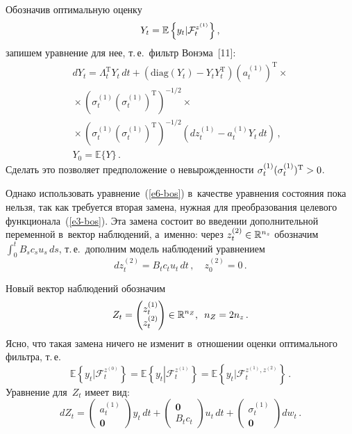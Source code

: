 \begin{multicols}{2}
     Обозначив оптимальную оценку 
     $$
     Y_t\hm= \mathbb{E} \left\{y_t \vert 
\mathcal{F}_t^{z^{(1)}}\right\},
$$
 запишем уравнение для нее, т.\,е.\ фильтр 
Во\-нэ\-ма~[11]:
         \begin{multline}
     dY_t= \Lambda_t^{\mathrm{T}} Y_t\,dt +\left( \mathrm{diag} \left(Y_t\right)-Y_t Y_t^{\mathrm{T}}\right) 
\left( a_t^{(1)}\right)^{\mathrm{T}} \times{}\\
{}\times \left( \sigma_t^{(1)} \left( 
\sigma_t^{(1)}\right)^{\mathrm{T}}\right)^{-1/2} \times\\
     {}\times 
     \left( \sigma_t^{(1)} \left( \sigma_t^{(1)}\right)^{\mathrm{T}}\right)^{-1/2} \left( 
dz_t^{(1)} -a_t^{(1)} Y_t \,dt\right) \,, \\ 
Y_0=\mathbb{E}\{Y\}\,.
     \label{e6-bos}
     \end{multline}
      Сделать это позволяет предположение о не\-вы\-рож\-ден\-ности  $\sigma_t^{(1)}(\sigma_t^{(1)})^{\mathrm{T}}\hm>0$. 
     
     Однако использовать уравнение~(\ref{e6-bos}) в~качестве уравнения состояния 
пока нельзя, так как требуется вторая замена, нужная для преобразования 
целевого функционала~(\ref{e3-bos}). Эта замена состоит во введении 
дополнительной переменной в~вектор наблюдений, а~именно: через 
$z_t^{(2)} \hm\in \mathbb{R}^{n_z}$ обозначим $\int\nolimits_0^t B_s c_s u_s 
\,ds$, т.\,е.\ дополним модель наблюдений уравнением
     $$
     dz_t^{(2)}=B_t c_t u_t \,dt\,,\quad z_0^{(2)}=0\,.
     $$
     
     Новый вектор наблюдений обозначим 
     $$
     Z_t= \begin{pmatrix} 
z_t^{(1)}\\ z_t^{(2)}\end{pmatrix} \in \mathbb{R}^{n_Z},\enskip n_Z=2n_z\,.
$$ 
Ясно, что такая замена ничего не изменит в~отношении оценки оптимального 
фильтра, т.\,е.\ 
$$
\mathbb{E}\left\{y_t\vert \mathcal{F}_t^{z^{(0)}}\right\}=\mathbb{E}
\left\{y_t\left\vert \mathcal{F}_t^{z^{(1)}}\right.\right\}=
\mathbb{E}\left\{y_t\vert 
\mathcal{F}_t^{z^{(1)},z^{(2)}}\right\}\,.
$$
 Уравнение для~$Z_t$ имеет вид:
     \begin{equation}
     dZ_t=\begin{pmatrix}
     a_t^{(1)}\\ \mathbf{0}
     \end{pmatrix} y_t \,dt +
     \begin{pmatrix}\mathbf{0}\\ B_t c_t
     \end{pmatrix} u_t \,dt+
      \begin{pmatrix}
     \sigma_t^{(1)}\\ \mathbf{0}
     \end{pmatrix} dw_t\,.
     \label{e7-bos}
     \end{equation}
     

\end{multicols}
